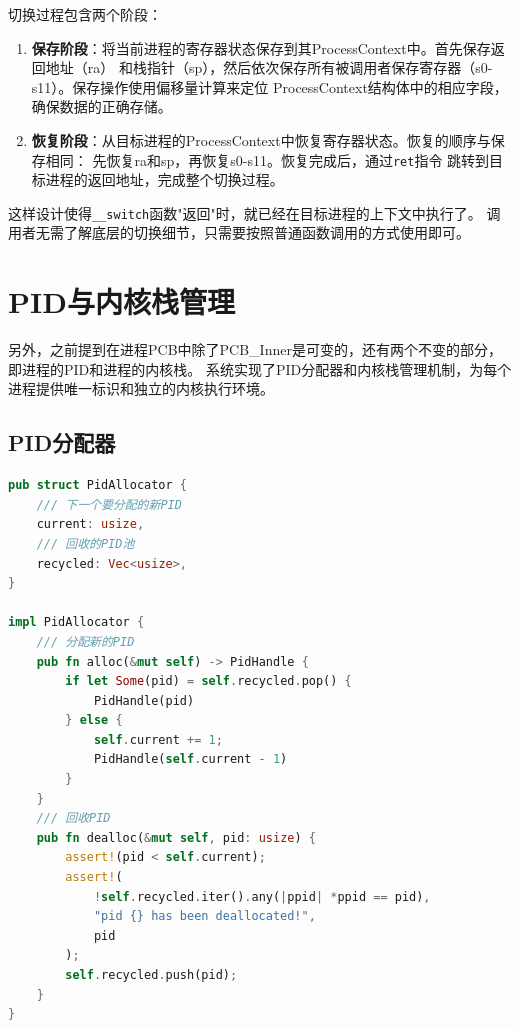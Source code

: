 切换过程包含两个阶段：

\begin{enumerate}
    \item \textbf{保存阶段}：将当前进程的寄存器状态保存到其ProcessContext中。首先保存返回地址（ra）
    和栈指针（sp），然后依次保存所有被调用者保存寄存器（s0-s11）。保存操作使用偏移量计算来定位
    ProcessContext结构体中的相应字段，确保数据的正确存储。
    
    \item \textbf{恢复阶段}：从目标进程的ProcessContext中恢复寄存器状态。恢复的顺序与保存相同：
    先恢复ra和sp，再恢复s0-s11。恢复完成后，通过\lstinline[language={[x86masm]Assembler}]{ret}指令
    跳转到目标进程的返回地址，完成整个切换过程。
\end{enumerate}

这样设计使得\lstinline[language=Rust]{__switch}函数"返回"时，就已经在目标进程的上下文中执行了。
调用者无需了解底层的切换细节，只需要按照普通函数调用的方式使用即可。

\section{PID与内核栈管理}

另外，之前提到在进程PCB中除了PCB\_Inner是可变的，还有两个不变的部分，即进程的PID和进程的内核栈。
系统实现了PID分配器和内核栈管理机制，为每个进程提供唯一标识和独立的内核执行环境。

\subsection{PID分配器}

\begin{lstlisting}[language=Rust,caption={PID分配器实现}, label={lst:pid-allocator}]
pub struct PidAllocator {
    /// 下一个要分配的新PID
    current: usize,
    /// 回收的PID池
    recycled: Vec<usize>,
}

impl PidAllocator {
    /// 分配新的PID
    pub fn alloc(&mut self) -> PidHandle {
        if let Some(pid) = self.recycled.pop() {
            PidHandle(pid)
        } else {
            self.current += 1;
            PidHandle(self.current - 1)
        }
    }
    /// 回收PID
    pub fn dealloc(&mut self, pid: usize) {
        assert!(pid < self.current);
        assert!(
            !self.recycled.iter().any(|ppid| *ppid == pid),
            "pid {} has been deallocated!",
            pid
        );
        self.recycled.push(pid);
    }
}
\end{lstlisting}

